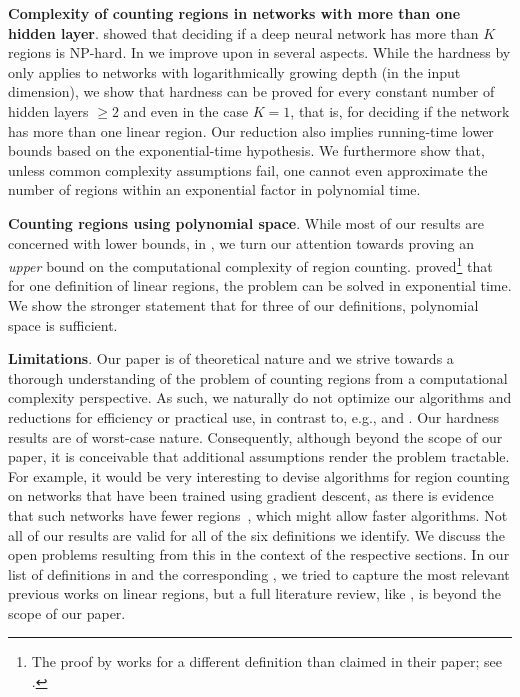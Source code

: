\documentclass{article}
\renewcommand{\paragraph}[1]{\textbf{#1}.}
\begin{document}
\paragraph{Complexity of counting regions in networks with more than one hidden layer}
\citet{wang2022estimation} showed that deciding if a deep neural network has more than $K$ regions is NP-hard.
In  we improve upon \citet{wang2022estimation} in several aspects. While the hardness by \citet{wang2022estimation} only applies to networks with logarithmically growing depth (in the input dimension), we show that hardness can be proved for every constant number of hidden layers $\geq 2$ and even in the case $K=1$, that is, for deciding if the network has more than one linear region. Our reduction also implies running-time lower bounds based on the exponential-time hypothesis. We furthermore show that, unless common complexity assumptions fail, one cannot even approximate the number of regions within an exponential factor in polynomial time.

\paragraph{Counting regions using polynomial space}
While most of our results are concerned with lower bounds, in , we turn our attention towards proving an \emph{upper} bound on the computational complexity of region counting. \citet{wang2022estimation} proved\footnote{The proof by \citet{wang2022estimation} works for a different definition than claimed in their paper; see .} that for one definition of linear regions, the problem can be solved in exponential time. We show the stronger statement that for three of our definitions, polynomial space is sufficient.

\paragraph{Limitations}
Our paper is of theoretical nature and we strive towards a thorough understanding of the problem of counting regions from a computational complexity perspective.
As such, we naturally do not optimize our algorithms and reductions for efficiency or practical use, in contrast to, e.g., \citet{serra2018bounding} and \citet{cai2023getting}. Our hardness results are of worst-case nature. Consequently, although beyond the scope of our paper, it is conceivable that additional assumptions render the problem tractable.
For example, it would be very interesting to devise algorithms for region counting on networks that have been trained using gradient descent, as there is evidence that such networks have fewer regions~\citep{hanin2019deep}, which might allow faster algorithms.
Not all of our results are valid for all of the six definitions we identify. We discuss the open problems resulting from this in the context of the respective sections. In our list of definitions in  and the corresponding , we tried to capture the most relevant previous works on linear regions, but a full literature review, like \citet{huchette2023deep}, is beyond the scope of our paper.
\end{document}

